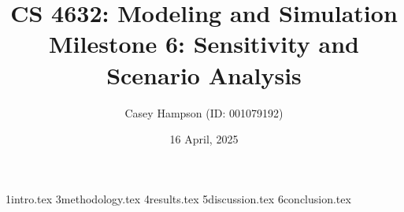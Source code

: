 \documentclass[titlepage]{article}
\title{CS 4632: Modeling and Simulation \\[5pt] Milestone 6: Sensitivity and Scenario Analysis}
\author{Casey Hampson (ID: 001079192)}
\date{16 April, 2025}
\begin{document}
    \maketitle
    \pagebreak
    \tableofcontents
    \pagebreak

    {1intro.tex}
    {3methodology.tex}
    {4results.tex}
    {5discussion.tex}
    {6conclusion.tex}

    \pagebreak
    \nocite{*}
    \printbibliography
\end{document}
